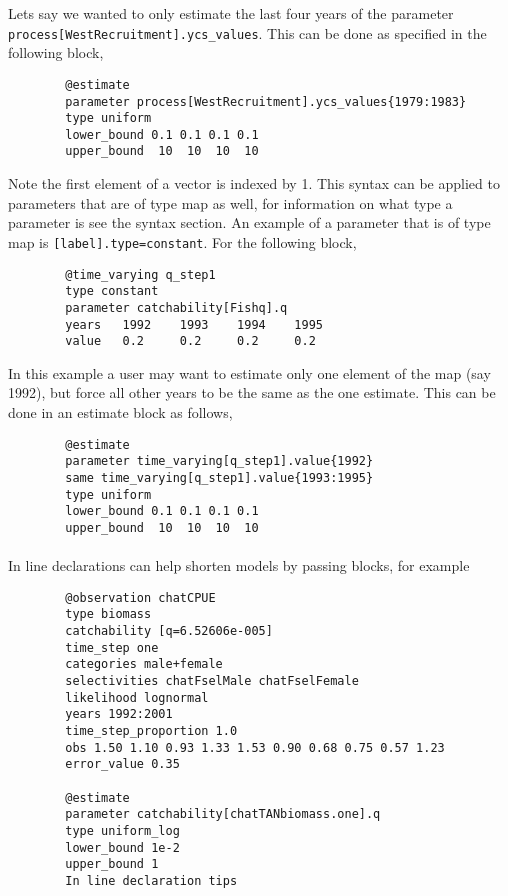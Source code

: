 Lets say we wanted to only estimate the last four years of the parameter \texttt{process[WestRecruitment].ycs\_values}. This can be done as specified in the following  block,

{\small{\begin{verbatim}
		@estimate
		parameter process[WestRecruitment].ycs_values{1979:1983}
		type uniform
		lower_bound 0.1 0.1 0.1 0.1
		upper_bound  10  10  10  10 
		\end{verbatim}}}

Note the first element of a vector is indexed by 1. This syntax can be applied to parameters that are of type map as well, for information on what type a parameter is see the syntax section. An example of a parameter that is of type map is \texttt{[label].type=constant}. For the following  block,

{\small{\begin{verbatim}
		@time_varying q_step1
		type constant
		parameter catchability[Fishq].q
		years 	1992	1993	1994	1995
		value 	0.2		0.2		0.2		0.2	
		\end{verbatim}}}

In this example a user may want to estimate only one element of the map (say 1992), but force all other years to be the same as the one estimate. This can be done in an estimate block as follows,
{\small{\begin{verbatim}
		@estimate
		parameter time_varying[q_step1].value{1992}
		same time_varying[q_step1].value{1993:1995}
		type uniform
		lower_bound 0.1 0.1 0.1 0.1
		upper_bound  10  10  10  10 
		\end{verbatim}}}
\paragraph*{\label{sec:declare}}
In line declarations can help shorten models by passing \command{} blocks, for example 
{\small{\begin{verbatim}
		@observation chatCPUE
		type biomass
		catchability [q=6.52606e-005]
		time_step one
		categories male+female
		selectivities chatFselMale chatFselFemale
		likelihood lognormal
		years 1992:2001
		time_step_proportion 1.0
		obs 1.50 1.10 0.93 1.33 1.53 0.90 0.68 0.75 0.57 1.23
		error_value 0.35
		
		@estimate 
		parameter catchability[chatTANbiomass.one].q
		type uniform_log
		lower_bound 1e-2
		upper_bound 1
		In line declaration tips
		\end{verbatim}}}

